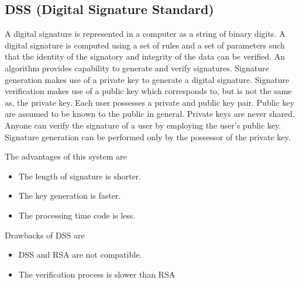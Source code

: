 \documentclass[12pt,journal,compsoc]{IEEEtran}
\begin{document}
\subsection{{DSS (Digital Signature Standard)}}
A digital signature is represented in a computer as a string of binary digits\cite{dss}. A digital signature is computed using a set of rules and a set of parameters such that the identity of the signatory and integrity of the data can be verified. An algorithm provides capability to generate and verify signatures. Signature generation\cite{dss} makes use of a private key to generate a digital signature. Signature verification\cite{dss} makes use of a public key which corresponds to, but is not the same as, the private key. Each user possesses a private and public key pair. Public key are assumed to be known to the public in general. Private keys are never shared. Anyone can verify the signature of a user by employing the user's public key. Signature generation can be performed only by the possessor of the private key.

The advantages of this system are
\begin{itemize}
	\item The length of signature is shorter.
	\item The key generation is faster.
	\item The processing time code is less.
\end{itemize}

Drawbacks of DSS are
\begin{itemize}
	\item DSS and RSA are not compatible.
	\item The verification process is slower than RSA
\end{itemize}
\end{document}
